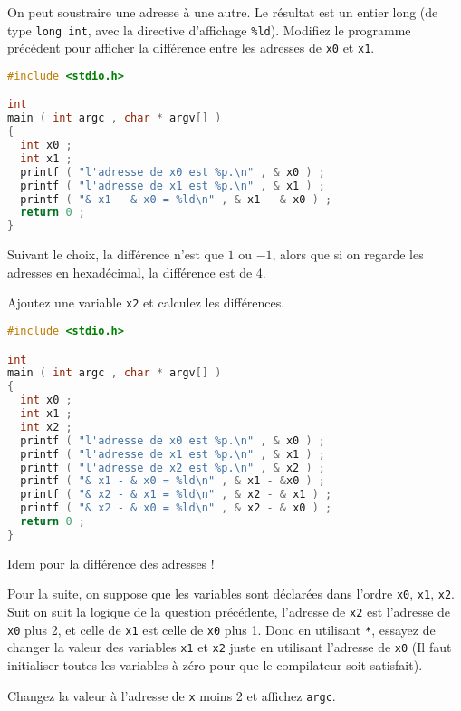 \question On peut soustraire une adresse à une autre. Le résultat est
un entier long (de type \texttt{long int}, avec la directive
d'affichage \texttt{\%ld}). Modifiez le programme précédent pour
afficher la différence entre les adresses de \texttt{x0} et
\texttt{x1}.

\begin{solutioncachee}
  \begin{lstlisting}[language=C]
#include <stdio.h>

int
main ( int argc , char * argv[] )
{
  int x0 ;
  int x1 ;
  printf ( "l'adresse de x0 est %p.\n" , & x0 ) ;
  printf ( "l'adresse de x1 est %p.\n" , & x1 ) ;
  printf ( "& x1 - & x0 = %ld\n" , & x1 - & x0 ) ;
  return 0 ;
}
  \end{lstlisting}

  Suivant le choix, la différence n'est que \(1\) ou \(-1\), alors que si on
  regarde les adresses en hexadécimal, la différence est de 4.
\end{solutioncachee}

\question Ajoutez une variable \texttt{x2} et calculez les différences.


\begin{solutioncachee}
  \begin{lstlisting}[language=C]
#include <stdio.h>

int
main ( int argc , char * argv[] )
{
  int x0 ;
  int x1 ;
  int x2 ;
  printf ( "l'adresse de x0 est %p.\n" , & x0 ) ;
  printf ( "l'adresse de x1 est %p.\n" , & x1 ) ;
  printf ( "l'adresse de x2 est %p.\n" , & x2 ) ;
  printf ( "& x1 - & x0 = %ld\n" , & x1 - &x0 ) ;
  printf ( "& x2 - & x1 = %ld\n" , & x2 - & x1 ) ;
  printf ( "& x2 - & x0 = %ld\n" , & x2 - & x0 ) ;
  return 0 ;
}
  \end{lstlisting}
  Idem pour la différence des adresses !
\end{solutioncachee}

\question Pour la suite, on suppose que les variables sont déclarées
dans l'ordre \texttt{x0}, \texttt{x1}, \texttt{x2}. Suit on suit la
logique de la question précédente, l'adresse de \texttt{x2} est
l'adresse de \texttt{x0} plus 2, et celle de \texttt{x1} est celle de
\texttt{x0} plus 1. Donc en utilisant \texttt{*}, essayez de changer la
valeur des variables \texttt{x1} et \texttt{x2} juste en utilisant
l'adresse de \texttt{x0} (Il faut initialiser toutes les variables à
zéro pour que le compilateur soit satisfait).

\question Changez la valeur à l'adresse de \texttt{x} moins 2 et
affichez \texttt{argc}.


